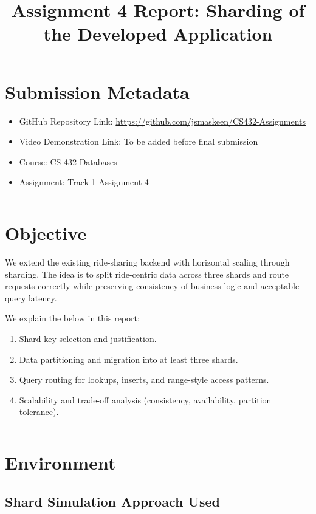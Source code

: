 \documentclass[12pt]{article}
\title{Assignment 4 Report: Sharding of the Developed Application}
\author{}
\date{}
\begin{document}
\maketitle

\section*{Submission Metadata}
\begin{itemize}
    \item GitHub Repository Link: \url{https://github.com/jsmaskeen/CS432-Assignments}
    \item Video Demonstration Link: To be added before final submission
    \item Course: CS 432 Databases
    \item Assignment: Track 1 Assignment 4
\end{itemize}

\hrule
\vspace{0.75em}

\section{Objective}

We extend the existing ride-sharing backend with horizontal scaling through sharding. The idea is to split ride-centric data across three shards and route requests correctly while preserving consistency of business logic and acceptable query latency.

We explain the below in this report:
\begin{enumerate}
    \item Shard key selection and justification.
    \item Data partitioning and migration into at least three shards.
    \item Query routing for lookups, inserts, and range-style access patterns.
    \item Scalability and trade-off analysis (consistency, availability, partition tolerance).
\end{enumerate}

\hrule
\vspace{0.75em}

\section{Environment}

\subsection{Shard Simulation Approach Used}
\end{document}
